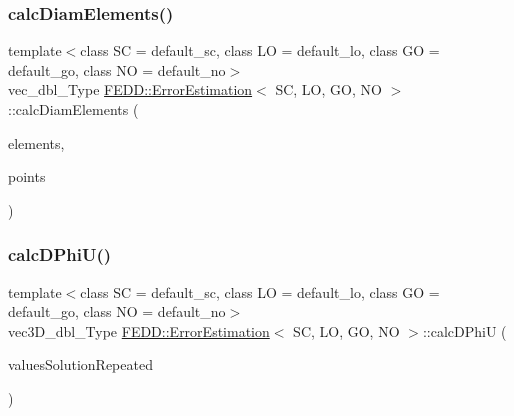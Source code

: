 \subsubsection{\texorpdfstring{calc\+Diam\+Elements()}{calcDiamElements()}}
{\footnotesize\ttfamily template$<$class SC  = default\+\_\+sc, class LO  = default\+\_\+lo, class GO  = default\+\_\+go, class NO  = default\+\_\+no$>$ \\
vec\+\_\+dbl\+\_\+\+Type \hyperlink{classFEDD_1_1ErrorEstimation}{F\+E\+D\+D\+::\+Error\+Estimation}$<$ SC, LO, GO, NO $>$\+::calc\+Diam\+Elements (\begin{DoxyParamCaption}\item[{\hyperlink{classFEDD_1_1ErrorEstimation_a524b367a9af6f2c128a7a7ae27d74535}{Elements\+New\+Ptr\+\_\+\+Type}}]{elements,  }\item[{vec2\+D\+\_\+dbl\+\_\+ptr\+\_\+\+Type}]{points }\end{DoxyParamCaption})}

\mbox{\label{classFEDD_1_1ErrorEstimation_a613a42ec996a21f606333d4a504a5ae0}} 
\subsubsection{\texorpdfstring{calc\+D\+Phi\+U()}{calcDPhiU()}}
{\footnotesize\ttfamily template$<$class SC  = default\+\_\+sc, class LO  = default\+\_\+lo, class GO  = default\+\_\+go, class NO  = default\+\_\+no$>$ \\
vec3\+D\+\_\+dbl\+\_\+\+Type \hyperlink{classFEDD_1_1ErrorEstimation}{F\+E\+D\+D\+::\+Error\+Estimation}$<$ SC, LO, GO, NO $>$\+::calc\+D\+PhiU (\begin{DoxyParamCaption}\item[{\hyperlink{classFEDD_1_1ErrorEstimation_a5882ff373bf8c409b407b4fd1f42bda0}{Multi\+Vector\+Ptr\+\_\+\+Type}}]{values\+Solution\+Repeated }\end{DoxyParamCaption})}

\mbox{\label{classFEDD_1_1ErrorEstimation_a9b506d6eb6e8c06186a5c3d0e36e92cb}} 
